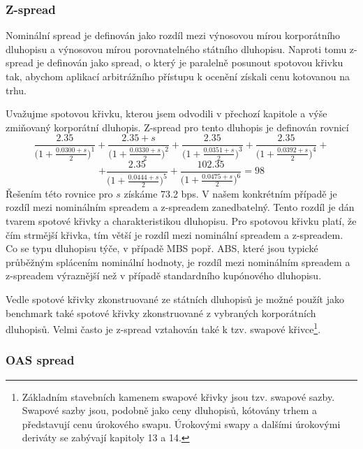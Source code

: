 \documentclass[a4paper]{book}
\begin{document}
\subsubsection{Z-spread}

Nominální spread je definován jako rozdíl mezi výnosovou mírou korporátního dluhopisu a výnosovou mírou porovnatelného státního dluhopisu. Naproti tomu z-spread je definován jako spread, o který je paralelně posunout spotovou křivku tak, abychom aplikací arbitrážního přístupu k ocenění získali cenu kotovanou na trhu.

Uvažujme spotovou křivku, kterou jsem odvodili v přechozí kapitole a výše zmiňovaný korporátní dluhopis. Z-spread pro tento dluhopis je definován rovnicí
\begin{equation*}
\frac{2.35}{\Big(1 + \frac{0.0300 + s}{2}\Big)^1} + \frac{2.35 + s}{\Big(1 + \frac{0.0330 + s}{2}\Big)^2} + \frac{2.35}{\Big(1 + \frac{0.0351 + s}{2}\Big)^3} + \frac{2.35}{\Big(1 + \frac{0.0392 + s}{2} \Big)^4} +
\end{equation*}
\begin{equation*}
+ \frac{2.35}{\Big(1 + \frac{0.0444 + s}{2} \Big)^5} + \frac{102.35}{\Big(1 + \frac{0.0475 + s}{2} \Big)^6} = 98
\end{equation*}   
Řešením této rovnice pro $s$ získáme 73.2 bps. V našem konkrétním případě je rozdíl mezi nominálním spreadem a z-spreadem zanedbatelný. Tento rozdíl je dán tvarem spotové křivky a charakteristikou dluhopisu. Pro spotovou křivku platí, že čím strmější křivka, tím větší je rozdíl mezi nominální spreadem a z-spreadem. Co se typu dluhopisu týče, v případě MBS popř. ABS, které jsou typické průběžným splácením nominální hodnoty, je rozdíl mezi nominálním spreadem a z-spreadem výraznější než v případě standardního kupónového dluhopisu.

Vedle spotové křivky zkonstruované ze státních dluhopisů je možné použít jako benchmark také spotové křivky zkonstruované z vybraných korporátních dluhopisů. Velmi často je z-spread vztahován také k tzv. swapové křivce\footnote{Základním stavebních kamenem swapové křivky jsou tzv. swapové sazby. Swapové sazby jsou, podobně jako ceny dluhopisů, kótovány trhem a představují cenu úrokového swapu. Úrokovými swapy a dalšími úrokovými deriváty se zabývají kapitoly 13 a 14.}.

\subsubsection{OAS spread}
\end{document}
